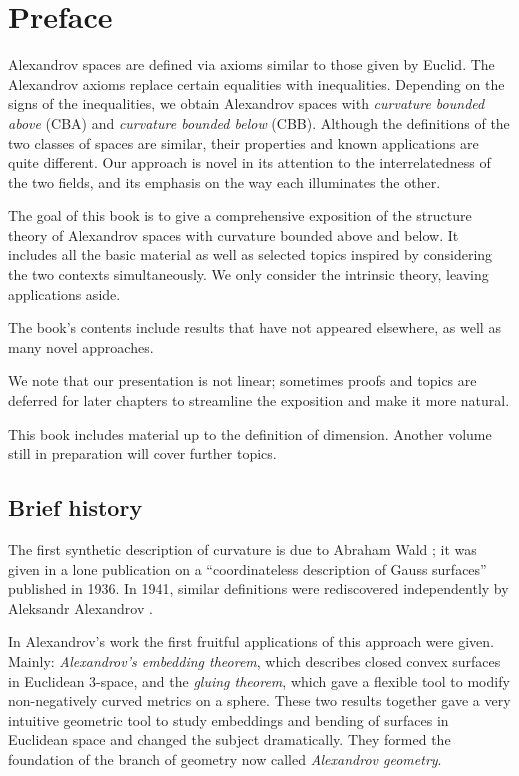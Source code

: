 \chapter*{Preface}


Alexandrov spaces are defined via axioms similar to those given by Euclid.
The Alexandrov axioms replace certain  equalities with inequalities. 
Depending on the signs of the inequalities, we obtain Alexandrov spaces with {}\emph{curvature bounded above} (CBA) and {}\emph{curvature bounded below} (CBB).
Although the definitions of the two classes of spaces are similar, their properties and known applications are quite different.
Our approach is novel in its attention to the interrelatedness of the two fields, and its emphasis on the way each illuminates the other.

The goal of this book is to give a comprehensive exposition of the structure theory of Alexandrov spaces 
with curvature bounded above and below.
It includes all the basic material as well as selected topics inspired by considering the two contexts simultaneously.
We only consider  the intrinsic theory, leaving applications aside. 

The book's contents include results that have not appeared elsewhere, as well as many novel approaches.

We note that our presentation is not linear;
sometimes proofs and topics are deferred for later chapters to streamline the exposition and make it more natural.

This book includes material up to the definition of dimension.
Another volume still in preparation will cover further topics.


\section*{Brief history}

The first synthetic description of curvature is due to Abraham Wald \cite{wald}; 
it was given in a lone publication on a ``coordinateless description of Gauss surfaces'' published in 1936.
In 1941, similar definitions were rediscovered independently by Aleksandr Alexandrov \cite{alexandrov:def}.

In Alexandrov's work the first fruitful applications of this approach were given.
Mainly: {}\emph{Alexandrov's embedding theorem}, which describes closed convex surfaces in Euclidean 3-space,
and the {}\emph{gluing theorem}, which gave a flexible tool to modify non-negatively curved metrics on a sphere.
These two results together gave  a very intuitive geometric tool to study embeddings and bending of surfaces in Euclidean space and changed the subject dramatically.
They formed the foundation of the branch of geometry now called {}\emph{Alexandrov geometry}.


